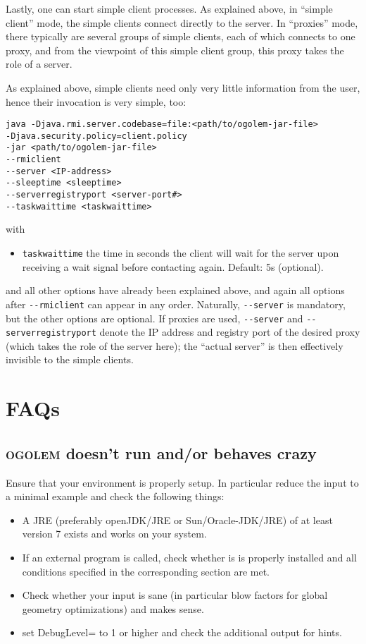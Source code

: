 \documentclass[a4paper,10pt]{scrbook}
\newcommand{\ogo}{\textsc{ogolem}}
\begin{document}
Lastly, one can start simple client processes. As explained above, in ``simple
client'' mode, the simple clients connect directly to the server. In
``proxies'' mode, there typically are several groups of simple clients, each
of which connects to one proxy, and from the viewpoint of this simple client
group, this proxy takes the role of a server.

As explained above, simple clients need only very little information from the
user, hence their invocation is very simple, too:
\begin{verbatim}
java -Djava.rmi.server.codebase=file:<path/to/ogolem-jar-file> 
-Djava.security.policy=client.policy 
-jar <path/to/ogolem-jar-file> 
--rmiclient 
--server <IP-address>
--sleeptime <sleeptime>
--serverregistryport <server-port#>
--taskwaittime <taskwaittime>
\end{verbatim}
with
\begin{itemize}
 \item \texttt{taskwaittime} the time in seconds the client will wait for the
   server upon receiving a wait signal before contacting again. Default: 5s
   (optional).
\end{itemize}
and all other options have already been explained above, and again all
options after \verb|--rmiclient| can appear in any order. Naturally,
\verb|--server| is mandatory, but the other options are optional. If proxies
are used, \verb|--server| and \verb|--serverregistryport| denote the IP
address and registry port of the desired proxy (which takes the role of the
server here); the ``actual server'' is then effectively invisible to the
simple clients.

\newpage
\chapter{FAQs}
\section{\ogo{} doesn't run and/or behaves crazy}
Ensure that your environment is properly setup. In particular reduce the input
to a minimal example and check the following things:
\begin{itemize}
  \item A JRE (preferably openJDK/JRE or Sun/Oracle-JDK/JRE) of at least version
7 exists and works on your system.
  \item If an external program is called, check whether is is properly installed
and all conditions specified in the corresponding section are met.
  \item  Check whether your input is sane (in particular blow factors for
global geometry optimizations) and makes sense.
  \item set DebugLevel= to 1 or higher and check the additional output for
hints.
\end{itemize}
\end{document}
